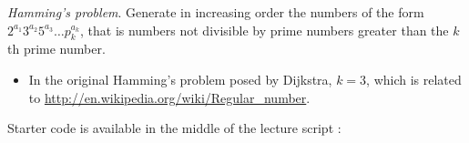 \documentclass{article}
\newcommand{\tmem}[1]{{\em #1\/}}
\newcommand{\tmverbatim}[1]{\text{{\ttfamily{#1}}}}
\begin{document}
\begin{exercise}
  {\tmem{Hamming's problem}}. Generate in increasing order the numbers of the
  form $2^{a_1} 3^{a_2} 5^{a_3} \ldots p_k^{a_k}$, that is numbers not
  divisible by prime numbers greater than the $k$th prime number.
  \begin{itemize}
    \item In the original Hamming's problem posed by Dijkstra, $k = 3$, which
    is related to
    \href{http://en.wikipedia.org/wiki/Regular_number}{http://en.wikipedia.org/wiki/Regular\_number}.
  \end{itemize}
  Starter code is available in the middle of the lecture script
  \tmverbatim{Lec7.ml}:\\
  {}{}{\hlopt{=
  }}{}{\hlendline{}}\\
  {\hlstd{ {\hlopt{\textbar}} }}{}{\hlopt{->
  }}{}{\hlendline{}}\\
  {\hlstd{ {\hlopt{\textbar}} }}{}{\hlopt{(}}{}{\hlopt{, }}{}{\hlopt{)
  ->}}{\hlendline{}}\\
  {\hlstd{ \ \ \ \ }}{}{}{}{}{\hlopt{(}}{}{\hlopt{, }}{}{\hlopt{(}}{}{\hlopt{(}}{}{}{}{\hlopt{)))}}{\hlendline{}}\\
  {\hlstd{ \ \ \ \ }}{}{}{\hlopt{(}}{}{}{}{\hlopt{)}}{\hlendline{}}\\
  {\hlendline{}}\\
  {}{}{\hlopt{=}}{\hlendline{}}\\
  {\hlstd{ }}{}{}{\hlopt{=
  }}{}{\hlendline{}}\\
  {\hlstd{ \ \ \ \
  }}{}{\hlopt{(}}{}{\hlopt{,}}{}{\hlopt{) ->
  }}{\hlkwd{LCons}}{\hlopt{(}}{\hlstd{p}}{\hlopt{, }}{\hlkwa{lazy
  }}{\hlopt{(}}{\hlstd{sieve }}{\hlopt{(}}{}{\hlopt{(}}{}{}{}{\hlopt{))))}}{\hlendline{}}\\
  {\hlstd{ \ \ }}{\hlopt{\textbar }}{}{\hlopt{->
  }}{}{}{\hlstd{{\hlendline{}}\\
  }}{}{}{\hlopt{= }}{}{\hlopt{(}}{}{}{\hlopt{-> }}{\hlstd{n
}}
\end{exercise}
\end{document}
